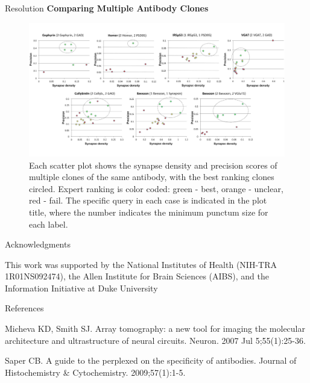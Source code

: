 \documentclass[final, table]{beamer}
\newlength{\onecolwid}
\begin{document}
\begin{frame}[t]
\begin{columns}[t]
\begin{column}{\onecolwid}
\begin{block}{Resolution}
\textbf{Comparing Multiple Antibody Clones} 


\begin{figure}
\centering
\includegraphics[width=1\textwidth]{figs/multiple_clones_graphs}
\caption{Each scatter plot shows the synapse density and precision scores of multiple clones of the same antibody, with the best ranking clones circled. Expert ranking is color coded: green - best, orange - unclear, red - fail. The specific query in each case is indicated in the plot title, where the number indicates the minimum punctum size for each label.  }
\label{fig:multiple_clones_graphs}
\end{figure}
\end{block} 

\begin{block}{Acknowledgments} 

\tiny{This work was supported by the National Institutes of Health (NIH-TRA 1R01NS092474), the Allen Institute for Brain Sciences (AIBS), and the Information Initiative at Duke University}
\end{block} 


\vspace{-0.05in}
\begin{block}{References}
\tiny{
\begin{thebibliography}{99}


Micheva KD, Smith SJ. Array tomography: a new tool for imaging the molecular architecture and ultrastructure of neural circuits. Neuron. 2007 Jul 5;55(1):25-36.

 Saper CB. A guide to the perplexed on the specificity of antibodies. Journal of Histochemistry \& Cytochemistry. 2009;57(1):1-5.


\end{thebibliography}}
\end{block}
\end{column}
\end{columns}
\end{frame}
\end{document}
